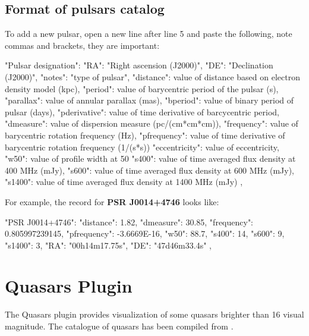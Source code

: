 \newpage
\subsection{Format of pulsars catalog}
\label{sec:plugins:Pulsars:format}

To add a new pulsar, open a new line after line 5 and paste the following, note commas and brackets, they are important:

\begin{configfile}
"Pulsar designation":
{
    "RA": "Right ascension (J2000)",
    "DE": "Declination (J2000)",
    "notes": "type of pulsar",
    "distance": value of distance based on electron density 
                model (kpc),
    "period": value of barycentric period of the pulsar (s),
    "parallax": value of annular parallax (mas),
    "bperiod": value of binary period of pulsar (days),
    "pderivative": value of time derivative of barcycentric 
                   period,
    "dmeasure": value of dispersion measure (pc/(cm*cm*cm)),
    "frequency": value of barycentric rotation frequency (Hz),
    "pfrequency": value of time derivative of barycentric 
                  rotation frequency (1/(s*s))
    "eccentricity": value of eccentricity,                   
    "w50": value of profile width at 50%
    "s400": value of time averaged flux density at 
            400 MHz (mJy),
    "s600": value of time averaged flux density at 
            600 MHz (mJy),
    "s1400": value of time averaged flux density at 
             1400 MHz (mJy)    
},
\end{configfile}

\noindent For example, the record for \textbf{PSR J0014+4746} looks like:
\begin{configfile}
"PSR J0014+4746":
{
    "distance": 1.82,
    "dmeasure": 30.85,
    "frequency": 0.805997239145,
    "pfrequency": -3.6669E-16,
    "w50": 88.7,
    "s400": 14,
    "s600": 9,
    "s1400": 3,
    "RA": "00h14m17.75s",
    "DE": "47d46m33.4s"
},
\end{configfile}

\newpage
\section{Quasars Plugin}
\label{sec:plugins:Quasars}

\noindent The Quasars plugin provides visualization of some quasars brighter than 16 visual magnitude. 
The catalogue of quasars has been compiled from .

